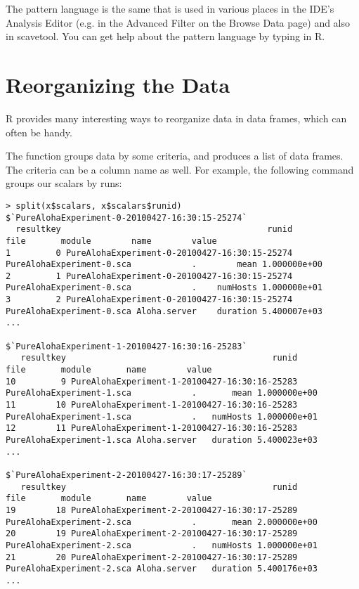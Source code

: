 The pattern language is the same that is used in various places in the IDE's Analysis Editor 
(e.g. in the Advanced Filter on the Browse Data page) and also in scavetool. You can get help
about the pattern language by typing  in R.


\section{Reorganizing the Data}

R provides many interesting ways to reorganize data in data frames, which can often be handy.

The  function groups data by some criteria, and produces a list of data frames.
The criteria can be a column name as well. For example, the following command groups our
scalars by runs:

\begin{verbatim}
> split(x$scalars, x$scalars$runid)
$`PureAlohaExperiment-0-20100427-16:30:15-25274`
  resultkey                                         runid                      file       module        name        value
1         0 PureAlohaExperiment-0-20100427-16:30:15-25274 PureAlohaExperiment-0.sca            .        mean 1.000000e+00
2         1 PureAlohaExperiment-0-20100427-16:30:15-25274 PureAlohaExperiment-0.sca            .    numHosts 1.000000e+01
3         2 PureAlohaExperiment-0-20100427-16:30:15-25274 PureAlohaExperiment-0.sca Aloha.server    duration 5.400007e+03
...

$`PureAlohaExperiment-1-20100427-16:30:16-25283`
   resultkey                                         runid                      file       module       name        value
10         9 PureAlohaExperiment-1-20100427-16:30:16-25283 PureAlohaExperiment-1.sca            .       mean 1.000000e+00
11        10 PureAlohaExperiment-1-20100427-16:30:16-25283 PureAlohaExperiment-1.sca            .   numHosts 1.000000e+01
12        11 PureAlohaExperiment-1-20100427-16:30:16-25283 PureAlohaExperiment-1.sca Aloha.server   duration 5.400023e+03
...

$`PureAlohaExperiment-2-20100427-16:30:17-25289`
   resultkey                                         runid                      file       module       name        value
19        18 PureAlohaExperiment-2-20100427-16:30:17-25289 PureAlohaExperiment-2.sca            .       mean 2.000000e+00
20        19 PureAlohaExperiment-2-20100427-16:30:17-25289 PureAlohaExperiment-2.sca            .   numHosts 1.000000e+01
21        20 PureAlohaExperiment-2-20100427-16:30:17-25289 PureAlohaExperiment-2.sca Aloha.server   duration 5.400176e+03
...
\end{verbatim}

